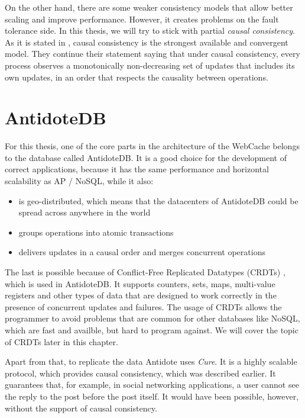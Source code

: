 On the other hand, there are some weaker consistency models that allow better scaling and improve performance. However, it creates problems on the fault tolerance side. In this thesis, we will try to stick with partial \textit{causal consistency}. As it is stated in \citet{7}, causal consistency is the strongest available and convergent model. They continue their statement saying that under causal consistency, every process observes a monotonically non-decreasing set of updates that includes its own updates, in an order that respects the causality between operations.

\section{AntidoteDB}

For this thesis, one of the core parts in the architecture of the WebCache belongs to the database called AntidoteDB\cite{4}. It is a good choice for the development of correct applications, because it has the same performance and horizontal scalability as AP / NoSQL\cite{14}, while it also:

\begin{itemize}
\item {is geo-distributed, which means that the datacenters of AntidoteDB could be spread across anywhere in the world}
\item {groups operations into atomic transactions\cite{9, 15}}
\item {delivers updates in a causal order and merges concurrent operations}
\end{itemize} 

The last is possible because of Conflict-Free Replicated Datatypes (CRDTs) \cite{2}, which is used in AntidoteDB. It supports counters, sets, maps, multi-value registers and other types of data that are designed to work correctly in the presence of concurrent updates and failures. The usage of CRDTs allows the programmer to avoid problems that are common for other databases like NoSQL, which are fast and availble, but hard to program against\cite{15}. We will cover the topic of CRDTs later in this chapter.

Apart from that, to replicate the data Antidote uses \textit{Cure}\cite{15}. It is a highly scalable protocol, which provides causal consistency, which was described earlier. It guarantees that, for example, in social networking applications, a user cannot see the reply to the post before the post itself. It would have been possible, however, without the support of causal consistency. 

